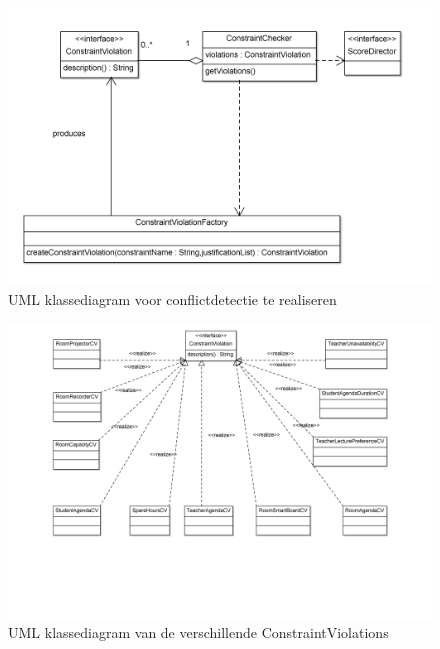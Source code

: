 \begin{figure}[H]
	\centering
	\includegraphics[scale=0.15]{img/conflictdetection}
	\caption{UML klassediagram voor conflictdetectie te realiseren}
	\label{fig:conflictdetection}
\end{figure}

 
\begin{figure}[H]
	\centering
	\includegraphics[scale=0.13]{img/constraintviolations}
	\caption{UML klassediagram van de verschillende ConstraintViolations}
	\label{fig:constraintviolations}
\end{figure}
